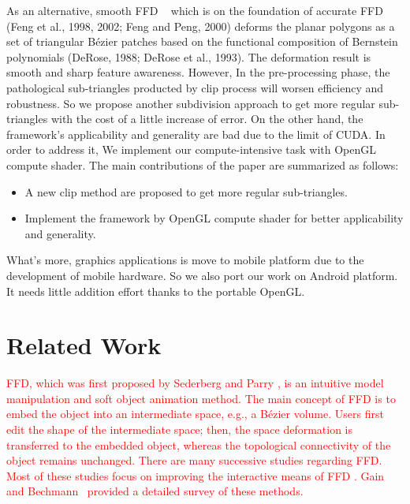 \documentclass[3p]{elsarticle}
\begin{document}
As an alternative, smooth FFD ~\cite{Cui13, Cui14, Cui15} which is on the foundation of accurate FFD (Feng et al., 1998, 2002; Feng and Peng, 2000) deforms the planar polygons as a set of triangular Bézier patches based on the functional composition of Bernstein polynomials (DeRose, 1988; DeRose et al., 1993). The deformation result is smooth and sharp feature awareness. However, In the pre-processing phase, the pathological sub-triangles producted by clip process will worsen efficiency and robustness. So we propose another subdivision approach to get more regular sub-triangles with the cost of a little increase of error. On the other hand, the framework's applicability and generality are bad due to the limit of CUDA. In order to address it, We implement our compute-intensive task with OpenGL compute shader.
The main contributions of the paper are summarized as follows:
\begin{itemize}
    \item A new clip method are proposed to get more regular sub-triangles.
    \item Implement the framework by OpenGL compute shader for better applicability and generality.
\end{itemize}

What's more, graphics applications is move to mobile platform due to the development of mobile hardware. So we also port our work on Android platform. It needs little addition effort thanks to the portable OpenGL.

\section{Related Work}\label{sec:related}

\textcolor{red}{FFD, which was first proposed by Sederberg and Parry \cite{Sederberg86}, is an intuitive model manipulation and soft
object animation method. The main concept of FFD is to embed the object into an intermediate space, e.g., a B\'ezier
volume. Users first edit the shape of the intermediate space; then, the space deformation is transferred to the embedded
object, whereas the topological connectivity of the object remains unchanged. There are many successive studies
regarding FFD. Most of these studies focus on improving the interactive means of FFD \cite{Coquillart90, Hui02,
MacCracken96, McDonnel07, Xu13}. Gain and Bechmann~\cite{Gain08} provided a detailed survey of these methods.}
\end{document}
